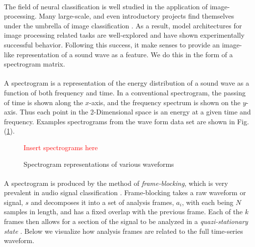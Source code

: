 \documentclass[12pt,letterpaper]{article}
\begin{document}
\paragraph*{}The field of neural classification is well studied in the application of image-processing. Many large-scale, and even introductory projects find themselves under the umbrella of image classification \cite{Geron,Goodfellow,Loy,Mierswa}. As a result, model architectures for image processing related tasks are well-explored and have shown experimentally successful behavior. Following this success, it make senses to provide an image-like representation of a sound wave as a feature. We do this in the form of a spectrogram matrix.

\paragraph*{}A spectrogram is a representation of the energy distribution of a sound wave as a function of both frequency and time. In a conventional spectrogram, the passing of time is shown along the $x$-axis, and the frequency spectrum is shown on the $y$-axis. Thus each point in the 2-Dimensional space is an energy at a given time and frequency. Examples spectrograms from the wave form data set are shown in Fig. (\ref{fig-spectrograms}).

\begin{figure}[H]
\begin{center}
\label{fig-spectrograms}
\textcolor{red}{Insert spectrograms here}
\caption{Spectrogram representations of various waveforms}
\end{center}
\end{figure}

\paragraph*{}A spectrogram is produced by the method of \textit{frame-blocking}, which is very prevalent in audio signal classification \cite{Liu,Zhang}. Frame-blocking takes a raw waveform or signal, $s$ and decomposes it into a set of analysis frames, $a_i$, with each being $N$ samples in length, and has a fixed overlap with the previous frame. Each of the $k$ frames then allows for a section of the signal to be analyzed in a \textit{quazi-stationary state} \cite{Kahn,Serizel}. Below we visualize how analysis frames are related to the full time-series waveform. 
\end{document}
